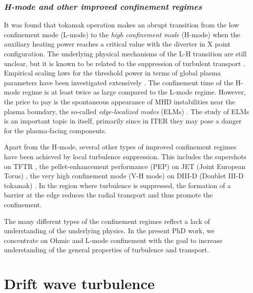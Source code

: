 \subsubsection*{\emph{H-mode and other improved confinement regimes}}

It was found that tokamak operation makes an abrupt transition from the low confinement mode (L-mode) to the \emph{high confinement mode} (H-mode) when the auxiliary heating power reaches a critical value with the diverter in X point configuration. The underlying physical mechanisms of the L-H transition are still unclear, but it is known to be related to the suppression of turbulent transport \cite{Shaing_1990_PoF, Groebner_1990_PRL, Manz_2012_PoP, Schmitz_2012_PRL}. Empirical scaling laws for the threshold power in terms of global plasma parameters have been investigated extensively \cite{Ryter_1998_PPCF, Connor_2000_PPCF, Verdoolaege_2015_NF}. The confinement time of the H-mode regime is at least twice as large compared to the L-mode regime. However, the price to pay is the spontaneous appearance of MHD instabilities near the plasma boundary, the so-called \emph{edge-localized modes} (ELMs) \cite{Zohm_1996_PPCF_ELM, Connor_1998_PPCF_ELM, Howard_2008_FST, Leonard_2014_PoP_ELM}. The study of ELMs is an important topic in itself, primarily since in ITER they may pose a danger for the plasma-facing components.

Apart from the H-mode, several other types of improved confinement regimes have been achieved by local turbulence suppression. This includes the supershots on TFTR \cite{Levinton_1995_PRL}, the pellet-enhancement performance (PEP) on JET (Joint European Torus) \cite{Smeulders_1995_NF}, the very high confinement mode (V-H mode) on DIII-D (Doublet III-D tokamak) \cite{Jackson_1991_PRL}. In the region where turbulence is suppressed, the formation of a barrier at the edge reduces the radial transport and thus promote the confinement.

The many different types of the confinement regimes reflect a lack of understanding of the underlying physics. In the present PhD work, we concentrate on Ohmic and L-mode confinement with the goal to increase understanding of the general properties of turbulence and transport.


\section{Drift wave turbulence} \label{sec:drift_wave_turbulence}

